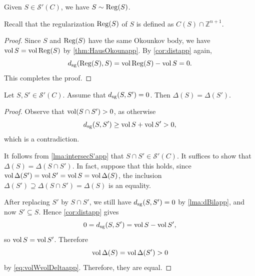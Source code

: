 \begin{lemma}\label{lma:regularizatapp}
    Given $S\in \mathcal{S}'(C)$, we have $S\sim \operatorname{Reg}(S)$.
\end{lemma}
Recall that the regularization $\operatorname{Reg}(S)$ of $S$ is defined as $C(S)\cap \mathbb{Z}^{n+1}$.
\begin{proof}
    Since $S$ and $\operatorname{Reg}(S)$ have the same Okounkov body,
    we have $\operatorname{vol} S=\operatorname{vol} \operatorname{Reg}(S)$ by \cref{thm:HausOkounapp}. By \cref{cor:distapp} again,
    \[
    d_{\mathrm{sg}}(\operatorname{Reg}(S),S)=\operatorname{vol} \operatorname{Reg}(S)-\operatorname{vol} S=0.
    \]
    This completes the proof.
\end{proof}


\begin{lemma}\label{lma:Deltaindclassapp}
	Let $S,S'\in \mathcal{S}'(C)$. Assume that $d_{\mathrm{sg}}(S,S')=0$. Then $\Delta(S)=\Delta(S')$.
\end{lemma}
\begin{proof}
Observe that $\operatorname{vol} (S\cap S')>0$, as otherwise
\[
d_{\mathrm{sg}}(S,S')\geq \operatorname{vol} S+\operatorname{vol} S'>0,
\]
which is a contradiction.

It follows from \cref{lma:intersecS'app} that $S\cap S'\in \mathcal{S}'(C)$. It suffices to show that $\Delta(S)=\Delta(S\cap S')$.
In fact, suppose that this holds, since $\operatorname{vol} \Delta(S')=\operatorname{vol} S'=\operatorname{vol} S=\operatorname{vol} \Delta(S)$, the inclusion $\Delta(S')\supseteq \Delta(S\cap S')=\Delta(S)$ is an equality.

After replacing $S'$ by $S\cap S'$, we still have $d_{\mathrm{sg}}(S,S')=0$ by \cref{lma:dBilapp}, and now $S'\subseteq S$.
Hence \cref{cor:distapp} gives
    \[
        0=d_{\mathrm{sg}}(S,S')=\operatorname{vol} S-\operatorname{vol} S',
    \]
so $\operatorname{vol} S=\operatorname{vol} S'$. Therefore
    \[
        \operatorname{vol}\Delta(S)=\operatorname{vol}\Delta(S')>0
    \]
by \eqref{eq:volWvolDeltaapp}. Therefore, they are equal.
\end{proof}

